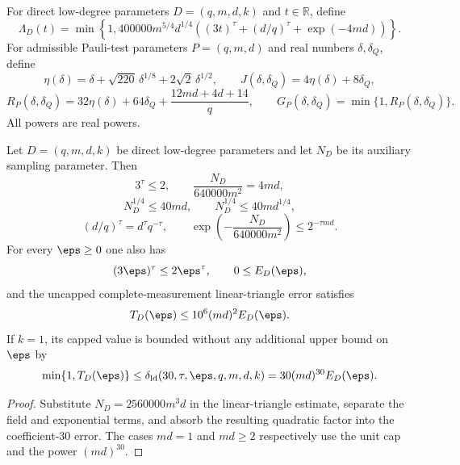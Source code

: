 \begin{definition}
\label{def:qld-native-error-scales}
\leanok
{}
For direct low-degree parameters $D=(q,m,d,k)$ and $t\in\mathbb R$, define
\[
 \Lambda_D(t)=\min\!\left\{1,
 400000m^{5/4}d^{1/4}
 \left((3t)^\tau+(d/q)^\tau+\exp(-4md)\right)\right\}.
\]
For admissible Pauli-test parameters $P=(q,m,d)$ and real numbers
$\delta,\delta_Q$, define
\[
 \eta(\delta)=\delta+\sqrt{220}\,\delta^{1/8}
   +2\sqrt2\,\delta^{1/2},
 \qquad
 J(\delta,\delta_Q)=4\eta(\delta)+8\delta_Q,
\]
\[
 R_P(\delta,\delta_Q)=32\eta(\delta)+64\delta_Q
   +\frac{12md+4d+14}{q},
 \qquad
 G_P(\delta,\delta_Q)=\min\{1,R_P(\delta,\delta_Q)\}.
\]
All powers are real powers.
\end{definition}

\begin{theorem}
\label{thm:qld-coefficient-thirty-ldt-scalars}
\leanok
{}
Let $D=(q,m,d,k)$ be direct low-degree parameters and let $N_D$ be its
auxiliary sampling parameter. Then
\[
 3^\tau\leq2,
 \qquad \frac{N_D}{640000m^2}=4md,
\]
\[
 N_D^{1/4}\leq40md,
 \qquad N_D^{1/4}\leq40m d^{1/4},
\]
\[
 (d/q)^\tau=d^\tau q^{-\tau},
 \qquad
 \exp\!\left(-\frac{N_D}{640000m^2}\right)\leq2^{-\tau md}.
\]
For every $\eps\geq0$ one also has
\[
 (3\eps)^\tau\leq2\eps^\tau,
 \qquad 0\leq E_D(\eps),
\]
and the uncapped complete-measurement linear-triangle error satisfies
\[
 T_D(\eps)\leq10^6(md)^2E_D(\eps).
\]
If $k=1$, its capped value is bounded without any additional upper bound on
$\eps$ by
\[
 \min\{1,T_D(\eps)\}
 \leq\delta_{\mathrm{ld}}(30,\tau,\eps,q,m,d,k)
 =30(md)^{30}E_D(\eps).
\]
\end{theorem}
\begin{proof}
\leanok
{}
Substitute $N_D=2560000m^3d$ in the linear-triangle estimate, separate the
field and exponential terms, and absorb the resulting quadratic factor into
the coefficient-$30$ error. The cases $md=1$ and $md\geq2$ respectively use
the unit cap and the power $(md)^{30}$.
\end{proof}

